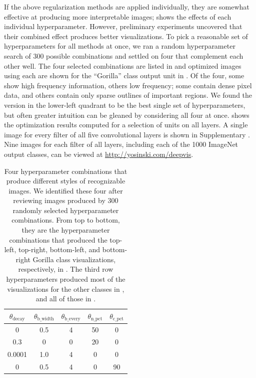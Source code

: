 \documentclass{article}
\begin{document}
If the above regularization methods are applied individually, they are
somewhat effective at producing more interpretable images;  shows the effects of each individual hyperparameter.
However, preliminary experiments uncovered that their combined
effect produces better visualizations. To pick a reasonable set of
hyperparameters for all methods at once, we ran a random
hyperparameter search of 300 possible combinations and settled on four
that complement each other well. The four selected combinations are
listed in  and optimized images using each are shown for the ``Gorilla'' class output unit in . Of the four, some show high
frequency information, others low frequency; some contain dense
pixel data, and others contain only sparse outlines of important
regions.
We found the version in the lower-left quadrant to be the best single set of hyperparameters, but often greater intuition can
be gleaned by considering all four at once.
 shows the optimization results computed for a selection of units on all layers. A single image for every filter of all five convolutional layers is shown in Supplementary . Nine images for each filter of all layers, including each of the 1000 ImageNet output classes, can be viewed at \url{http://yosinski.com/deepvis}.

\begin{table}[t]
\caption{Four hyperparameter combinations that produce different styles of recognizable images. We identified these four after reviewing images produced by 300 randomly selected hyperparameter combinations. From top to bottom, they are the hyperparameter combinations that produced the top-left, top-right, bottom-left, and bottom-right Gorilla class visualizations, respectively, in . The third row hyperparameters produced most of the visualizations for the other classes in , and all of those in .
}
\begin{center}
\begin{tabular}{|c|c|c|c|c|}
  \hline
  $\theta_{\mathrm{decay}}$ & $\theta_{\mathrm{b\_width}}$ & $\theta_{\mathrm{b\_every}}$ & $\theta_{\mathrm{n\_pct}}$ & $\theta_{\mathrm{c\_pct}}$  \\
  \hline
    0    &   0.5   &     4    &    50    &    0 \\
    0.3  &    0    &     0    &    20    &    0 \\
  0.0001 &   1.0   &     4    &     0    &    0 \\
    0    &   0.5   &     4    &     0    &   90 \\
\hline
\end{tabular}
\end{center}
\end{table}
\end{document}
